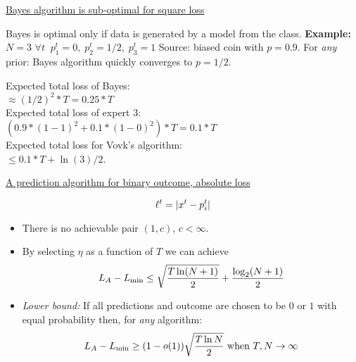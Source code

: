 \begin{flushleft}
\begin{LARGE}
\begin{center}
\underline{Bayes algorithm is sub-optimal for square loss}
\end{center}

Bayes is optimal only if data is generated by a model
from the class.
\newline
\newline
{\bf Example:}\newline
$N=3$\newline
$\forall t\;\; p_1^t=0,\; p_2^t=1/2,\; p_3^t=1$\newline
Source: biased coin with $p=0.9$.
\newline\newline
For {\em any} prior: Bayes algorithm quickly converges to $p=1/2$.
\newline
\begin{tabbing}
Expected \= total loss of Bayes: \\ \> $ \approx (1/2)^2*T=0.25*T$ \\
Expected total loss of expert 3: \\ \> $(0.9*(1-1)^2+0.1*(1-0)^2)*T=0.1*T$ \\
Expected total loss for Vovk's algorithm: \\ \> $\leq 0.1*T+\ln(3)/2$.
\end{tabbing}
\pagebreak

\begin{center}
\underline{A prediction algorithm for binary outcome, absolute loss}
\end{center}
\[ \ell_{}^{t} =  |x^t - p_i^t| \]

\begin{itemize}
\item
There is no achievable pair $(1,c)$, $c<\infty$.
\item
By selecting $\eta$ as a function of $T$ we can achieve
\[
L_A - L_{\min} \leq  \sqrt{T \ln (N+1) \over 2} + {\log_2(N+1) \over 2}
\]
\item
{\em Lower bound:} If all predictions and outcome are chosen to be $0$
or $1$ with equal probability  then, for {\em any} algorithm:
\[
L_A - L_{\min} \geq (1-o(1)) \sqrt{T \ln N \over 2} 
\mbox{ when } T,N \to \infty
\]
\end{itemize}

\pagebreak


\end{LARGE}
\end{flushleft}
